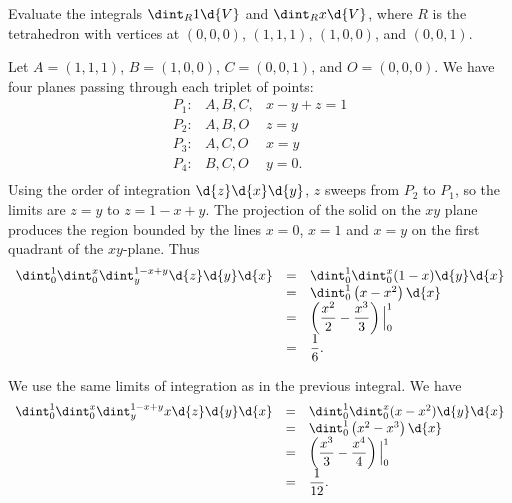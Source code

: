 \begin{pro}
 Evaluate the integrals $\dint _R 1\d{V}$ and  $\dint _R x\d{V}$, where $R$ is 
the
tetrahedron with vertices at $(0,0,0)$, $(1,1,1)$, $(1,0,0)$, and
$(0,0,1)$.
\begin{answer}
Let $A=(1,1,1)$, $B=(1,0,0)$,  $C=(0,0,1)$, and $O=(0,0,0)$. We have
four planes passing through each triplet of points:
$$\begin{array}{lll}P_1: & A, B, C, &  x-y+z=1\\
P_2: & A, B, O & z=y \\
P_3: & A,C, O & x=y \\
P_4: & B, C, O & y = 0. \\
  \end{array}$$
Using the order of integration $\d{z}\d{x}\d{y}$, $z$ sweeps from
$P_2$ to $P_1$, so the limits are $z=y$ to $z=1-x+y$. The projection
of the solid on the $xy$ plane produces the region bounded by the
lines $x=0$, $x=1$ and $x=y$ on the first quadrant of the
$xy$-plane. Thus
$$\begin{array}{lll} \dint _0 ^1\dint _0 ^{x} \dint _y ^{1-x+y} \d{z}\d{y}\d{x} 
& = &
\dint _0 ^1\dint _0 ^{x} (1-x)\d{y}\d{x} \\
& = & \dint _0 ^1 \left(x-x^2\right)\d{x}\\
& = & \left(\dfrac{x^2}{2}-\dfrac{x^3}{3}\right)\Big|_0 ^1\\
& = & \dfrac{1}{6}.
\end{array}$$


\bigskip


 We use the same limits of integration as in the previous integral. We have
$$\begin{array}{lll} \dint _0 ^1\dint _0 ^{x} \dint _y ^{1-x+y}x \d{z}\d{y}\d{x} 
& = &
\dint _0 ^1\dint _0 ^{x} (x-x^2)\d{y}\d{x} \\
& = & \dint _0 ^1 \left(x^2-x^3\right)\d{x}\\
& = & \left(\dfrac{x^3}{3}-\dfrac{x^4}{4}\right)\Big|_0 ^1\\
& = & \dfrac{1}{12}.
\end{array}$$

\end{answer}
\end{pro}

